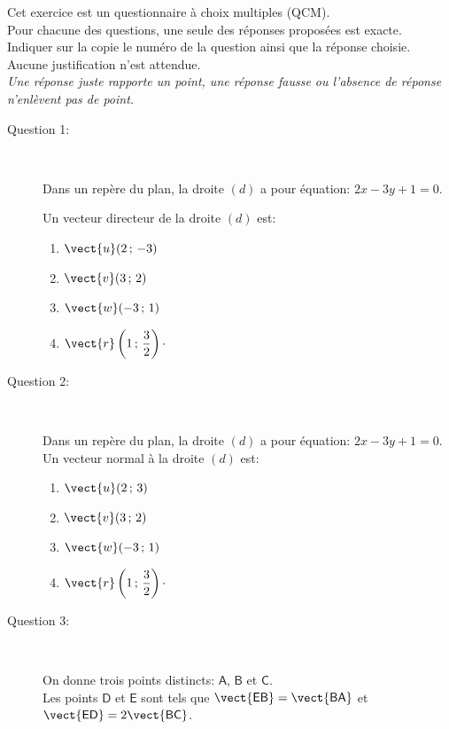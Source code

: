 \medskip

Cet exercice est un questionnaire à choix multiples (QCM).\\
Pour chacune des questions, une seule des réponses proposées est exacte.\\
Indiquer sur la copie le numéro de la question ainsi que la réponse choisie.\\
Aucune justification n'est attendue.\\
\emph{Une réponse juste rapporte un point, une
réponse fausse ou l'absence de réponse n'enlèvent pas de point.}

\begin{description}
\item[Question 1:]\ 

Dans un repère du plan, la droite $(d)$ a pour équation: $2x-3y+1=0$.

Un vecteur directeur de la droite $(d)$ est:

\begin{enumerate}[label=\textbf{\alph{*}.},itemjoin=\hfil,afterlabel={~~}]
\item $\vect{u}(2\,;\,-3)$ \item $\vect{v}(3\,;\,2)$ \item $\vect{w}(-3\,;\,1)$ \item $\vect{r}\left(1\,;\,\dfrac{3}{2}\right)\cdotp$
\end{enumerate}

\item[Question 2:]\ 

Dans un repère du plan, la droite $(d)$ a pour équation: $2x-3y+1=0$. Un vecteur normal à la droite $(d)$
est:

\begin{enumerate}[label=\textbf{\alph{*}.},itemjoin=\hfil,afterlabel={~~}]
\item $\vect{u}(2\,;\,3)$ \item $\vect{v}(3\,;\,2)$ \item $\vect{w}(-3\,;\,1)$ \item $\vect{r}\left(1\,;\,\dfrac{3}{2}\right)\cdotp$
\end{enumerate}

\item[Question 3:]\ 

On donne trois points distincts: $\mathsf{A}$, $\mathsf{B}$ et $\mathsf{C}$.\\
Les points $\mathsf{D}$ et $\mathsf{E}$ sont tels que $\vect{\mathsf{EB}}=\vect{\mathsf{BA}}$ et $\vect{\mathsf{ED}}=2\vect{\mathsf{BC}}$.


\end{description}
